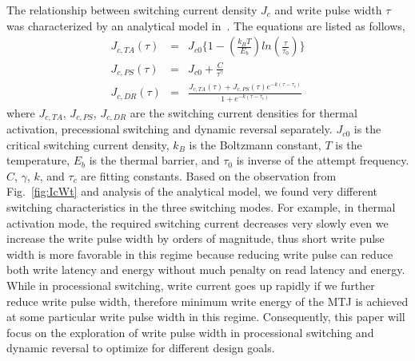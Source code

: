 The relationship between switching current density $J_{c}$ and write pulse width $\tau$ was characterized by an analytical model in~\cite{STTRAM:IEDM09}. The equations are listed as follows,
\begin{eqnarray}
J_{c,TA}(\tau) &=& J_{c0}\{1- (\frac{k_{B}T}{E_{b}})ln(\frac{\tau}{\tau_{0}})\} \label{eqn:jcta} \\
J_{c,PS}(\tau) &=& J_{c0}+ \frac{C}{\tau^{\gamma}} \label{eqn:jcps} \\
J_{c,DR}(\tau) &=& \frac{J_{c,TA}(\tau)+J_{c,PS}(\tau)e^{-k(\tau - \tau_{c})}}{1+e^{-k(\tau - \tau_{c})}} \label{eqn:jcdr}
\end{eqnarray}
where $J_{c,TA}$, $J_{c,PS}$, $J_{c,DR}$ are the switching current densities for thermal activation, precessional switching and dynamic reversal separately. $J_{c0}$ is the critical switching current density, $k_{B}$ is the Boltzmann constant, $T$ is the temperature, $E_{b}$ is the thermal barrier, and $\tau_{0}$ is inverse of the attempt frequency. $C$, $\gamma$, $k$, and $\tau_{c}$ are fitting constants. Based on the observation from Fig.~\ref{fig:IcWt} and analysis of the analytical model,  we found very different switching characteristics in the three switching modes. For example, in thermal activation mode, the required switching current decreases very slowly even we increase the write pulse width by orders of magnitude, thus short write pulse width is more favorable in this regime because reducing write pulse can reduce both write latency and energy without much penalty on read latency and energy. While in processional switching, write current goes up rapidly if we further reduce write pulse width, therefore minimum write energy of the MTJ is achieved at some particular write pulse width in this regime. Consequently, this paper will focus on the exploration of write pulse width in processional switching and dynamic reversal to optimize for different design goals.

